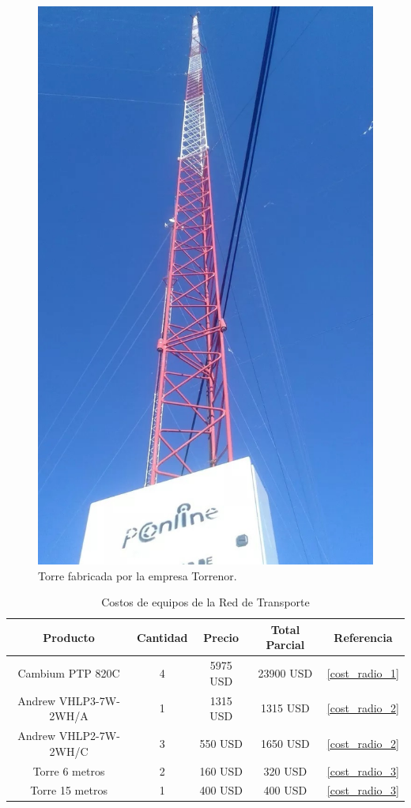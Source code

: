 \documentclass[12pt,a4paper]{book}
\begin{document}
\begin{figure}
\centering
\includegraphics[width= 6 cm]{../figuras/red_transporte_17.jpg}
\caption{Torre fabricada por la empresa Torrenor.}
\label{fig_red_transporte_17}
\end{figure}


\begin{table} [H]
\begin{center}
\begin{tabular}{|c|c|c|c|c|}
\hline 
Producto & Cantidad & Precio & Total Parcial & Referencia \\ 
\hline 
Cambium PTP 820C & 4 & 5975 USD & 23900 USD & \ref{cost_radio_1}\\ 
\hline 
Andrew VHLP3-7W-2WH/A & 1 & 1315 USD & 1315 USD & \ref{cost_radio_2}\\ 
\hline 
Andrew VHLP2-7W-2WH/C & 3 & 550 USD & 1650 USD & \ref{cost_radio_2}\\ 
\hline 
Torre 6 metros & 2 & 160 USD & 320 USD & \ref{cost_radio_3}\\ 
\hline 
Torre 15 metros & 1 & 400 USD & 400 USD & \ref{cost_radio_3} \\ 
\hline 
\end{tabular} 
\end{center}
\caption{Costos de equipos de la Red de Transporte}
\label{tabla_precios_transp}
\end{table}
\end{document}
